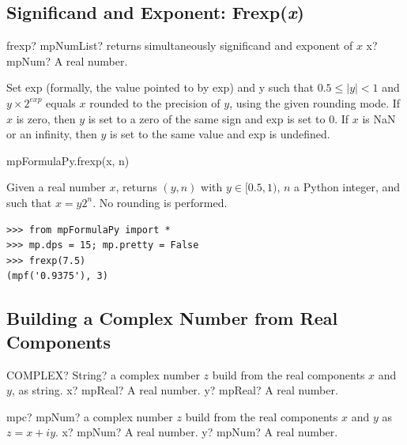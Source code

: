 \subsection{Significand and Exponent: Frexp(\textit{x})}

\begin{mpFunctionsExtract}
	\mpFunctionOne
	{frexp? mpNumList? returns simultaneously significand and exponent of $x$}
	{x? mpNum? A real number.}
\end{mpFunctionsExtract}

\vspace{0.3cm}
Set exp (formally, the value pointed to by exp) and y such that $0.5 \leq |y| < 1$ and $y \times 2^{exp}$ equals $x$ rounded to the precision of $y$, using the given rounding mode. If $x$ is zero, then $y$ is set to a zero of the same sign and exp is set to 0. If $x$ is NaN or an infinity, then $y$ is set to the same value and exp is undefined.

mpFormulaPy.frexp(x, n)

\vpara
Given a real number $x$, returns $(y,n)$ with $y \in [0.5,1)$, $n$ a Python integer, and such that $x=y2^n$. No rounding is performed.

\begin{lstlisting}
>>> from mpFormulaPy import *
>>> mp.dps = 15; mp.pretty = False
>>> frexp(7.5)
(mpf('0.9375'), 3)
\end{lstlisting}




\subsection{Building a Complex Number from Real Components}


\begin{mpFunctionsExtract}
	\mpWorksheetFunctionTwoNotImplemented
	{COMPLEX? String? a complex number $z$ build from the real components $x$ and $y$, as string.}
	{x? mpReal? A real number.}
	{y? mpReal? A real number.}
\end{mpFunctionsExtract}

\vspace{0.6cm}

\begin{mpFunctionsExtract}
	\mpFunctionTwo
	{mpc? mpNum? a complex number $z$ build from the real components $x$ and $y$ as $z=x+iy$.}
	{x? mpNum? A real number.}
	{y? mpNum? A real number.}
\end{mpFunctionsExtract}


